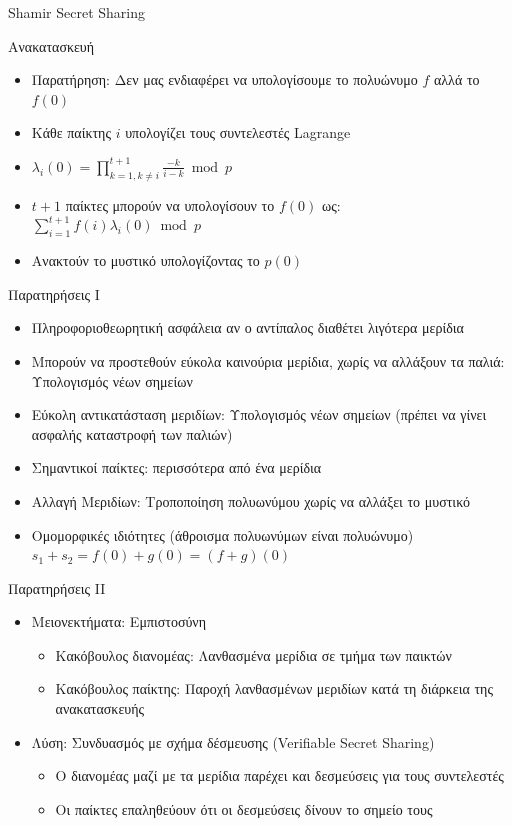 \documentclass[handout]{beamer}
\begin{document}
\begin{frame}[allowframebreaks]{Shamir Secret Sharing}
\framebreak
\begin{block}{Ανακατασκευή}
\begin{itemize}
\item Παρατήρηση: Δεν μας ενδιαφέρει να υπολογίσουμε το πολυώνυμο $f$ αλλά το $f(0)$
\item Κάθε παίκτης $i$ υπολογίζει τους συντελεστές Lagrange
\item $\lambda_i(0) = \prod_{k=1, k \neq i}^{t+1} \frac{-k}{i-k} \bmod{p}$
\item $t+1$ παίκτες μπορούν να υπολογίσουν το $f(0)$ ως: $\sum_{i=1}^{t+1} f(i) \lambda_i(0) \bmod{p}$
\item Ανακτούν το μυστικό υπολογίζοντας το $p(0)$
\end{itemize}
\end{block}
\end{frame}

\begin{frame}{Παρατηρήσεις I}
\begin{itemize}
\item Πληροφοριοθεωρητική ασφάλεια αν ο αντίπαλος διαθέτει λιγότερα μερίδια
\pause
\item Μπορούν να προστεθούν εύκολα καινούρια μερίδια, χωρίς να αλλάξουν τα παλιά: Υπολογισμός νέων σημείων
\pause
\item Εύκολη αντικατάσταση μεριδίων: Υπολογισμός νέων σημείων (πρέπει να γίνει ασφαλής καταστροφή των παλιών)
\pause
\item Σημαντικοί παίκτες: περισσότερα από ένα μερίδια
\pause
\item Αλλαγή Μεριδίων: Τροποποίηση πολυωνύμου χωρίς να αλλάξει το μυστικό
\pause
\item Ομομορφικές ιδιότητες (άθροισμα πολυωνύμων είναι πολυώνυμο) \\
$s_1 + s_2 = f(0) + g(0) = (f+g)(0)$
\end{itemize}
\end{frame}

\begin{frame}{Παρατηρήσεις II}
\begin{itemize}
\item Μειονεκτήματα: Εμπιστοσύνη
\begin{itemize}
\item Κακόβουλος διανομέας: Λανθασμένα μερίδια σε τμήμα των παικτών 
\pause
\item Κακόβουλος παίκτης: Παροχή λανθασμένων μεριδίων κατά τη διάρκεια της ανακατασκευής
\pause
\end{itemize}
\item Λύση: Συνδυασμός με σχήμα δέσμευσης (Verifiable Secret Sharing)
\pause
\begin{itemize}
\item Ο διανομέας μαζί με τα μερίδια παρέχει και δεσμεύσεις για τους συντελεστές
\item Οι παίκτες επαληθεύουν ότι οι δεσμεύσεις δίνουν το σημείο τους
\end{itemize}
\end{itemize}
\end{frame}
\end{document}
